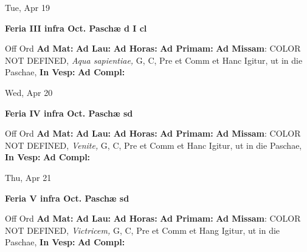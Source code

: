 \documentclass[10pt]{book}
\begin{document}
\begin{center}
\begin{minipage}{3.5in}
\vspace{2em}
\begin{center}Tue, Apr 19
\end{center}
\textbf{ \large Feria III infra Oct. Paschæ
\textnormal{\normalsize d I cl}}

\begin{justify}Off Ord
\textbf{Ad Mat: }
\textbf{Ad Lau: }
\textbf{Ad Horas: }
\textbf{Ad Primam: }\textbf{Ad Missam}: COLOR NOT DEFINED, \textit{Aqua sapientiae,} G, C, Pre et Comm et Hanc Igitur, ut in die Paschae, 
\textbf{In Vesp: }
\textbf{Ad Compl: }
\end{justify}
\end{minipage}
\end{center}

\begin{center}
\begin{minipage}{3.5in}
\vspace{2em}
\begin{center}Wed, Apr 20
\end{center}
\textbf{ \large Feria IV infra Oct. Paschæ
\textnormal{\normalsize sd}}

\begin{justify}Off Ord
\textbf{Ad Mat: }
\textbf{Ad Lau: }
\textbf{Ad Horas: }
\textbf{Ad Primam: }\textbf{Ad Missam}: COLOR NOT DEFINED, \textit{Venite,} G, C, Pre et Comm et Hanc Igitur, ut in die Paschae, 
\textbf{In Vesp: }
\textbf{Ad Compl: }
\end{justify}
\end{minipage}
\end{center}

\begin{center}
\begin{minipage}{3.5in}
\vspace{2em}
\begin{center}Thu, Apr 21
\end{center}
\textbf{ \large Feria V infra Oct. Paschæ
\textnormal{\normalsize sd}}

\begin{justify}Off Ord
\textbf{Ad Mat: }
\textbf{Ad Lau: }
\textbf{Ad Horas: }
\textbf{Ad Primam: }\textbf{Ad Missam}: COLOR NOT DEFINED, \textit{Victricem,} G, C, Pre et Comm et Hang Igitur, ut in die Paschae, 
\textbf{In Vesp: }
\textbf{Ad Compl: }
\end{justify}
\end{minipage}
\end{center}
\end{document}
